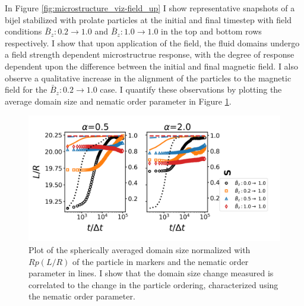 In Figure \ref{fig:microstructure_viz-field_up} I show representative
snapshots of a bijel stabilized with prolate particles at the initial
and final timestep with field conditions
$\bar{B}_z: 0.2 \rightarrow 1.0$ and
$\bar{B}_z: 1.0 \rightarrow 1.0$ in the top and bottom rows
respectively. I show that upon application of the field, the fluid
domains undergo a field strength dependent microstructrue response, with
the degree of response dependent upon the difference between the initial
and final magnetic field. I also observe a qualitative increase in the
alignment of the particles to the magnetic field for the
$\bar{B}_z: 0.2 \rightarrow 1.0$ case. I quantify these observations
by plotting the average domain size and nematic order parameter in
Figure \ref{fig:domain_size-field_up}.

\begin{figure} 
\centering 
\includegraphics[scale=0.5]{../figures/results/paper2/domain_size-field_up.png} 
\caption{Plot of the spherically averaged domain size normalized with $Rp(L/R)$ of the particle in markers and the nematic order parameter in lines. 
         I show that the domain size change measured is correlated to the change in the particle ordering, characterized using the nematic order parameter.} 
\label{fig:domain_size-field_up} 
\end{figure}

